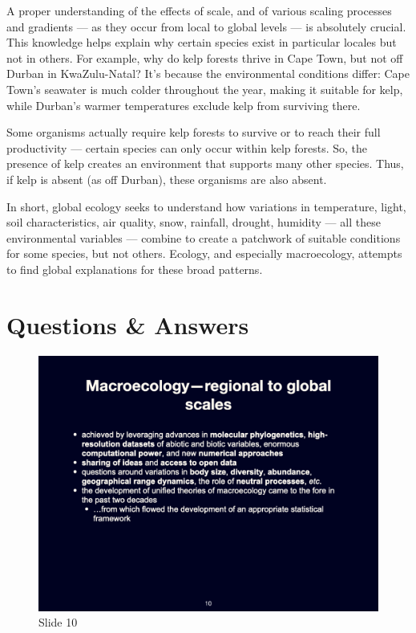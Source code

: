 \documentclass[
  10pt,
]{book}
\begin{document}
A proper understanding of the effects of scale, and of various scaling
processes and gradients --- as they occur from local to global levels
--- is absolutely crucial. This knowledge helps explain why certain
species exist in particular locales but not in others. For example, why
do kelp forests thrive in Cape Town, but not off Durban in
KwaZulu-Natal? It's because the environmental conditions differ: Cape
Town's seawater is much colder throughout the year, making it suitable
for kelp, while Durban's warmer temperatures exclude kelp from surviving
there.

Some organisms actually require kelp forests to survive or to reach
their full productivity --- certain species can only occur within kelp
forests. So, the presence of kelp creates an environment that supports
many other species. Thus, if kelp is absent (as off Durban), these
organisms are also absent.

In short, global ecology seeks to understand how variations in
temperature, light, soil characteristics, air quality, snow, rainfall,
drought, humidity --- all these environmental variables --- combine to
create a patchwork of suitable conditions for some species, but not
others. Ecology, and especially macroecology, attempts to find global
explanations for these broad patterns.

\section{Questions \& Answers}\label{questions-answers-1}

\begin{figure}[ht]
\centering
\includegraphics[width=0.8\linewidth]{../images/BDC334/BDC334-010.jpeg}
\caption*{Slide 10}
\end{figure}
\end{document}
